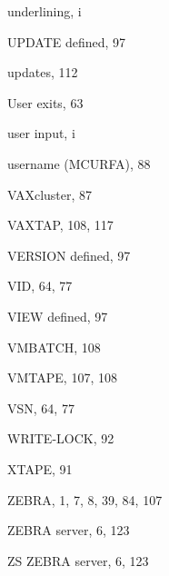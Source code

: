 \begin{theindex}
  \indexspace

  \item underlining, i
  \item UPDATE
    \subitem defined, 97
  \item updates, 112
  \item User exits, 63
  \item user input, i
  \item username (MCURFA), 88

  \indexspace

  \item VAXcluster, 87
  \item VAXTAP, 108, 117
  \item VERSION
    \subitem defined, 97
  \item VID, 64, 77
  \item VIEW
    \subitem defined, 97
  \item VMBATCH, 108
  \item VMTAPE, 107, 108
  \item VSN, 64, 77

  \indexspace

  \item WRITE-LOCK, 92

  \indexspace

  \item XTAPE, 91

  \indexspace

  \item ZEBRA, 1, 7, 8, 39, 84, 107
  \item ZEBRA server, 6, 123
  \item ZS ZEBRA server, 6, 123

\end{theindex}
